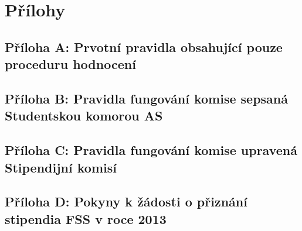 
\chapter{Přílohy}

\section{Příloha A: Prvotní pravidla obsahující pouze proceduru hodnocení}


\newpage
\section{Příloha B: Pravidla fungování komise sepsaná Studentskou komorou AS}


\newpage
\section{Příloha C: Pravidla fungování komise upravená Stipendijní komisí}


\newpage
\section{Příloha D: Pokyny k žádosti o přiznání stipendia FSS v roce 2013}
